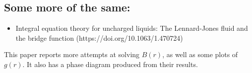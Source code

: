 \documentclass[journal=jacsat,manuscript=article]{achemso}
\begin{document}
\subsection{Some more of the same:}
\begin{itemize}
\item Integral equation theory for uncharged liquids: The Lennard-Jones fluid and the bridge function (https://doi.org/10.1063/1.470724)
\end{itemize}
This paper reports more attempts at solving $B(r)$, as well as some plots of $g(r)$. It also has a phase diagram produced from their results.


	
\end{document}
